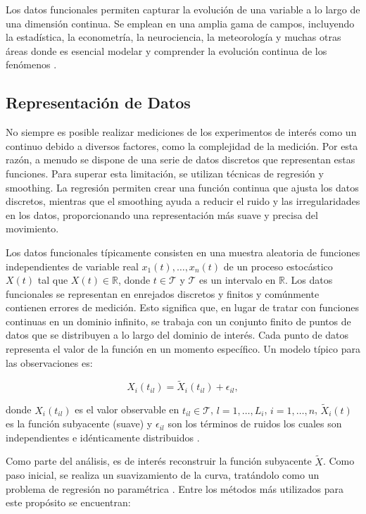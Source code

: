 Los datos funcionales permiten capturar la evolución de una variable a lo largo de una dimensión continua. Se emplean en una amplia gama de campos, incluyendo la estadística, la econometría, la neurociencia, la meteorología y muchas otras áreas donde es esencial modelar y comprender la evolución continua de los fenómenos \cite{boxplotFun}.

\subsection{Representación de Datos}

No siempre es posible realizar mediciones de los experimentos de interés como un continuo debido a diversos factores, como la complejidad de la medición. Por esta razón, a menudo se dispone de una serie de datos discretos que representan estas funciones. Para superar esta limitación, se utilizan técnicas de regresión y smoothing. La regresión permiten crear una función continua que ajusta los datos discretos, mientras que el smoothing ayuda a reducir el ruido y las irregularidades en los datos, proporcionando una representación más suave y precisa del movimiento.

Los datos funcionales típicamente consisten en una muestra aleatoria de funciones independientes de variable real $x_1(t), \dots , x_n(t)$ de un proceso estocástico $X(t)$ tal que $X(t) \in \mathbb{R}$,  donde $t \in \mathcal{T}$ y $\mathcal{T}$ es un intervalo en $\mathbb{R}$. Los datos funcionales se representan en enrejados discretos y finitos y comúnmente contienen errores de medición. Esto significa que, en lugar de tratar con funciones continuas en un dominio infinito, se trabaja con un conjunto finito de puntos de datos que se distribuyen a lo largo del dominio de interés. Cada punto de datos representa el valor de la función en un momento específico. Un modelo típico para las observaciones es:

\begin{equation}
     X_i(t_{il}) = \widetilde{X}_i(t_{il}) + \epsilon_{il},
\end{equation}

donde $X_i(t_{il})$ es el valor observable en $t_{il} \in \mathcal{T}$, $l = 1, \dots, L_{i}$, $i = 1, \dots, n$, $\widetilde{X}_i(t)$ es la función subyacente (suave) y $\epsilon_{il}$ son los términos de ruidos los cuales son independientes e idénticamente distribuidos \cite{Gertheiss}.

Como parte del análisis, es de interés reconstruir la función subyacente $\widetilde{X}$. Como paso inicial, se realiza un suavizamiento de la curva, tratándolo como un problema de regresión no paramétrica \cite{Gertheiss}. Entre los métodos más utilizados para este propósito se encuentran: 


